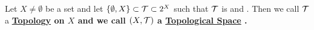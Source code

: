 
\newcommand{\TopologicalSpace}[2]{
    \pa{#1, \Topology{#1}{#2}}
}
\newcommand{\Topology}[2]{
    #2_{#1}
}
\newcommand{\TopologicalSpaceRef}[0]{
    \bf \hyperref[def:TopologicalSpace]{Topological Space} \rm
}
\newcommand{\TopologyRef}[0]{
        \bf \hyperref[def:TopologicalSpace]{Topology} \rm
}

\begin{df}
    \label{def:TopologicalSpace}
    Let $X \neq \emptyset$ be a set 
    and let $\{\emptyset, X\} \subset \mathcal{T} \subset 2^X$ such that
    $\mathcal{T}$ is 
    \ClosedUnderArbitraryUnions and \ClosedUnderFiniteIntersections. 
    Then we call $\mathcal{T}$ a \TopologyRef on $X$ and we call 
    $(X,\mathcal{T})$ a \TopologicalSpaceRef. 
\end{df}



